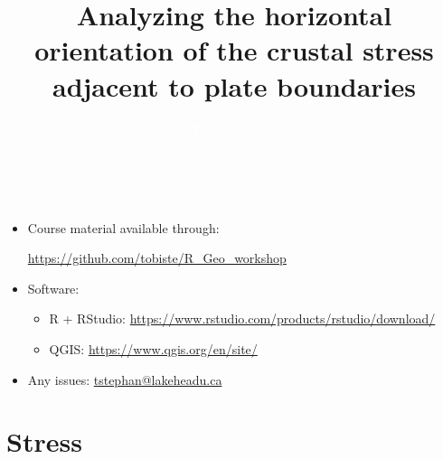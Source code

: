 \documentclass[10pt,xcolor=dvipsnames, aspectratio=169]{beamer}
\author{\textcolor{white}{Tobias Stephan}}
\date{\textcolor{white}{09/10/2023}}
\title[Analysing stress orientation]{Analyzing the horizontal orientation of the crustal stress adjacent to plate boundaries}
\institute[LakeheadU]{\textcolor{white}{Lakehead University, Thunder Bay, ON}}
\begin{document}
  
{
\begin{frame}[plain]
    \titlepage
  \end{frame}
}

\begin{frame}
\begin{itemize}
  \item Course material available through:\\
  \begin{center}
    \url{https://github.com/tobiste/R_Geo_workshop}
  \end{center}
  \item Software:
    \begin{itemize}
      \item R + RStudio: \url{https://www.rstudio.com/products/rstudio/download/}
      \item QGIS: \url{https://www.qgis.org/en/site/}
    \end{itemize}
  \item Any issues: \href{mailto:tstephan@lakeheadu.ca}{tstephan@lakeheadu.ca}
\end{itemize}

   
\end{frame}

\section{Stress}
\end{document}
